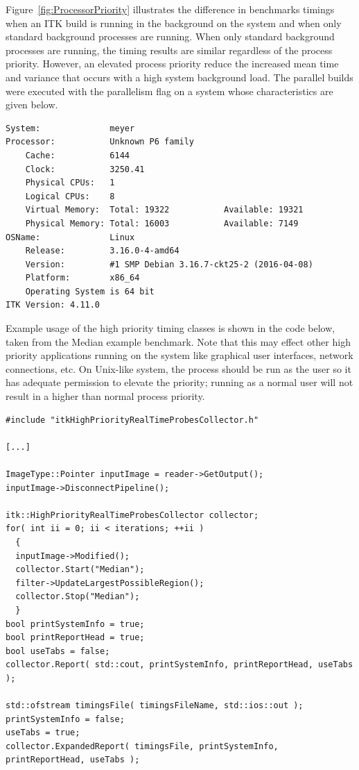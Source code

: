 \documentclass{InsightArticle}
\begin{document}
Figure~\ref{fig:ProcessorPriority} illustrates the difference in benchmarks
timings when an ITK build is running in the background on the system and when
only standard background processes are running. When only standard background
processes are running, the timing results are similar regardless of the
process priority. However, an elevated process priority reduce the increased
mean time and variance that occurs with a high system background load.  The
parallel builds were executed with the  parallelism flag on a
system whose characteristics are given below.

\begin{verbatim}
System:              meyer
Processor:           Unknown P6 family
    Cache:           6144
    Clock:           3250.41
    Physical CPUs:   1
    Logical CPUs:    8
    Virtual Memory:  Total: 19322           Available: 19321
    Physical Memory: Total: 16003           Available: 7149
OSName:              Linux
    Release:         3.16.0-4-amd64
    Version:         #1 SMP Debian 3.16.7-ckt25-2 (2016-04-08)
    Platform:        x86_64
    Operating System is 64 bit
ITK Version: 4.11.0
\end{verbatim}

Example usage of the high priority timing classes is shown in the code below,
taken from the Median example benchmark. Note that this may effect other high
priority applications running on the system like graphical user interfaces,
network connections, etc. On Unix-like system, the process should be run as the  user so it has adequate permission to elevate the priority; running as a normal user will not result in a higher than normal process priority.
\begin{verbatim}
#include "itkHighPriorityRealTimeProbesCollector.h"

[...]

ImageType::Pointer inputImage = reader->GetOutput();
inputImage->DisconnectPipeline();

itk::HighPriorityRealTimeProbesCollector collector;
for( int ii = 0; ii < iterations; ++ii )
  {
  inputImage->Modified();
  collector.Start("Median");
  filter->UpdateLargestPossibleRegion();
  collector.Stop("Median");
  }
bool printSystemInfo = true;
bool printReportHead = true;
bool useTabs = false;
collector.Report( std::cout, printSystemInfo, printReportHead, useTabs );

std::ofstream timingsFile( timingsFileName, std::ios::out );
printSystemInfo = false;
useTabs = true;
collector.ExpandedReport( timingsFile, printSystemInfo, printReportHead, useTabs );
\end{verbatim}
\end{document}
